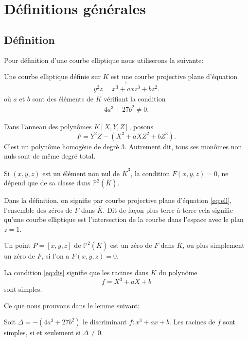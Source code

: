 \chapter{Définitions générales}

\section{Définition}
Pour définition d'une courbe elliptique nous utiliserons la suivante:

\begin{definition}
    Une courbe elliptique définie sur $K$ est une courbe projective plane d'équation
    \[
    ,\] 
    \begin{align}
        \label{eq:ell}
    y^2z=x^3+axz^3+bz^2
    .\end{align}
    où $a$ et $b$ sont des éléments de $K$ vérifiant la condition
    \begin{align}
        \label{eq:dis}
    4a^3+27b^2\neq 0
    .\end{align}
\end{definition}

Dans l'anneau des polynômes $K\left[ X,Y,Z \right] $, posons 
\[
F=Y^2Z-\left( X^3+aXZ^2+bZ^3 \right) 
.\] 
C'est un polynôme homogène de degrè $3$. Autrement dit, tous ses monômes non nuls sont de même degré total.

Si $(x,y,z)$ est un élément non nul de $\overline{K}^3$, la condition $F(x,y,z)=0$, ne dépend que de sa classe dans $\mathbb{P}^2(\overline{K})$.

\begin{remarque}
    Dans la définition, on signifie par courbe projective plane d'équation \eqref{eq:ell}, l'ensemble des zéros de $F$ dans $\overline{K}$. Dit de façon plus terre à terre cela signifie qu'une courbe elliptique est l'intersection de la courbe dans l'espace avec le plan $z=1$. 

    Un point $P=\left[ x,y,z \right] $ de $\mathbb{P}^2(\overline{K})$ est un zéro de $F$ dans $\overline{K}$, ou plus simplement un zéro de $F$, si l'on a $F(x,y,z)=0$.
\end{remarque}

La condition \eqref{eq:dis} signifie que les racines dans $\overline{K}$ du polynôme
\[
f=X^3+aX+b
\] 
sont simples.

Ce que nous prouvons dans le lemme suivant:

\begin{lemme}
    \label{lem:lemme1}
    Soit $\Delta= -(4a^3 + 27b^2)$ le discriminant $f : x^3 + ax + b$. 
    Les racines de $f$ sont simples, si et seulement si $\Delta \neq 0$.
\end{lemme}

